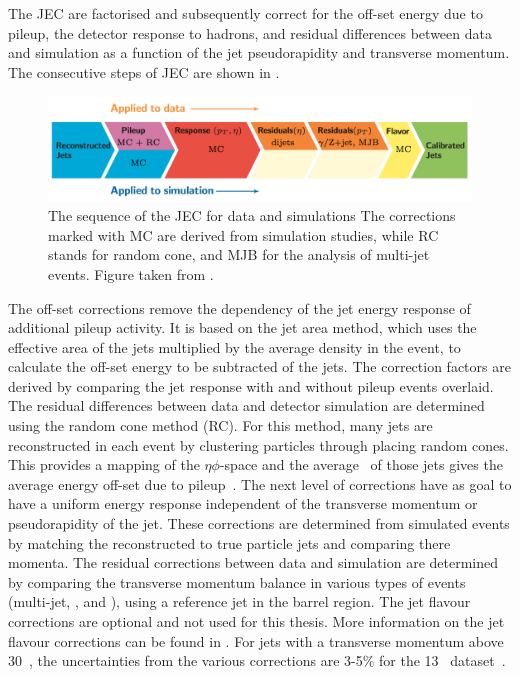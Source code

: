 The JEC are factorised and subsequently correct for the off-set energy due to pileup, the detector response to hadrons, and residual differences between data and simulation as a function of the jet pseudorapidity and transverse momentum.  The consecutive steps of JEC are shown in . 
\begin{figure}[htbp]
	\centering
	\includegraphics[width=1.\linewidth]{4_EventRecoSelect/Figures/JES}
	\caption{The sequence of the JEC for data and simulations The corrections marked with MC are derived from simulation studies, while RC stands for random cone, and MJB for the analysis of multi-jet events. Figure taken from \cite{1748-0221-12-02-P02014}.}
	\label{fig:jes}
\end{figure}
The off-set corrections remove the dependency of the jet energy response of additional pileup activity. It is based on the jet area method, which uses the effective area of the jets multiplied by the average density in the event, to calculate the off-set energy to be subtracted of the jets.  The correction factors are derived by comparing the jet response with and without pileup events overlaid. The residual differences between data and detector simulation are determined using the random cone method (RC). For this method, many jets are reconstructed in each event by clustering particles through placing  random cones. This provides a mapping of the $\eta\phi$-space and the average \pt\ of those jets gives the average energy off-set due to pileup~\cite{1748-0221-12-02-P02014}. 
The next level of corrections have as goal to have a uniform energy response independent of the transverse momentum or pseudorapidity of the jet.  These corrections are determined from simulated events by matching the reconstructed to true particle jets and comparing there momenta. 
The residual corrections between data and simulation are determined by comparing the transverse momentum balance in various types of events (multi-jet, \Zjets, and \pjets), using a reference jet in the barrel region.  
The jet flavour corrections are optional and not used for this thesis. More information on the jet flavour corrections can be found in \cite{1748-0221-12-02-P02014}. For jets with a transverse momentum above 30~\GeV, the uncertainties from the various corrections are 3-5\% for the 13 \TeV\ dataset~\cite{CMS-DP-2016-020}.


